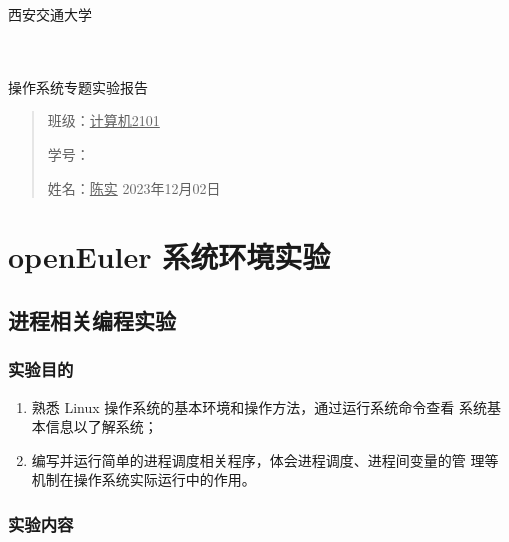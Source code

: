 \documentclass{article}
\date{}
\begin{document}
\thispagestyle{empty} %
西安交通大学
	\begin{center}
		\quad \\
		\quad \\
        \vskip 1.5cm
		\heiti {} 操作系统专题实验报告
	\end{center}
	\vskip 12cm

	\begin{quotation}
		\songti \fontsize{15}{15}
		\doublespacing
		\par\setlength\parindent{14em}
		\quad 

		班级：\underline{\quad 计算机2101\quad}

		学号：\underline{\quad}

		姓名：\underline{\qquad\quad 陈实\qquad }
		\vskip 1cm
		\centering
		2023年12月02日
	\end{quotation}

    \newpage
    \thispagestyle{empty} %
    \tableofcontents

    \thispagestyle{empty}

    \newpage
    \setcounter{page}{1}
    \section{openEuler 系统环境实验}

    \subsection{进程相关编程实验}
    \subsubsection{实验目的}
    \begin{enumerate}
        \item 熟悉 Linux 操作系统的基本环境和操作方法，通过运行系统命令查看
        系统基本信息以了解系统；
        \item 编写并运行简单的进程调度相关程序，体会进程调度、进程间变量的管
        理等机制在操作系统实际运行中的作用。
    \end{enumerate}


    \subsubsection{实验内容}
\end{document}
